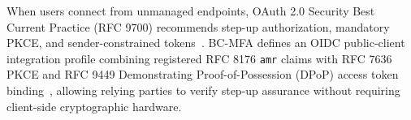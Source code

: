 When users connect from unmanaged endpoints, OAuth 2.0 Security Best Current Practice (RFC 9700) recommends step-up authorization, mandatory PKCE, and sender-constrained tokens~\cite{rfc9700bcp}. BC-MFA defines an OIDC public-client integration profile combining registered RFC 8176 \texttt{amr} claims with RFC 7636 PKCE and RFC 9449 Demonstrating Proof-of-Possession (DPoP) access token binding~\cite{rfc7636pkce, rfc8176amr, rfc9449dpop}, allowing relying parties to verify step-up assurance without requiring client-side cryptographic hardware.
